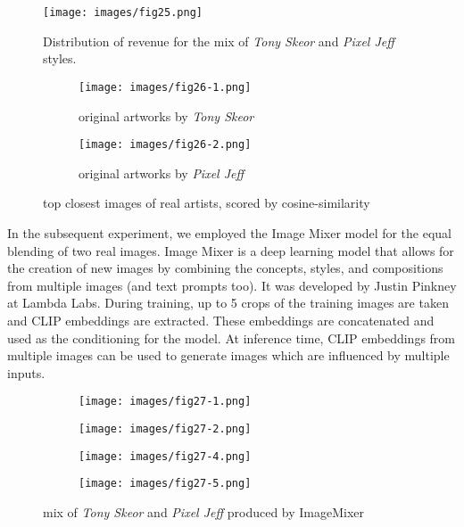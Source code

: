\documentclass[12pt, letterpaper]{article}
\begin{document}
\begin{figure}[h]
    \centering
    \texttt{[image: images/fig25.png]}
    \caption{Distribution of revenue for the mix of \textit{Tony Skeor} and \textit{Pixel Jeff} styles.}
    \label{fig25:image1}
\end{figure}

\begin{figure}[h]
    \centering
    
    \begin{subfigure}{0.48\textwidth}
        \centering
        \texttt{[image: images/fig26-1.png]}
        \caption{original artworks by \textit{Tony Skeor}}
        \label{fig26:first_image}
    \end{subfigure}
    \begin{subfigure}{0.48\textwidth}
        \centering
        \texttt{[image: images/fig26-2.png]}
        \caption{original artworks by \textit{Pixel Jeff}}
        \label{fig26:second_image}
    \end{subfigure}

    \caption{top closest images of real artists, scored by cosine-similarity}
    \label{fig26:all_images}    

\end{figure}

In the subsequent experiment, we employed the Image Mixer \cite{pinkney2022imagemixer} model for the equal blending of two real images. 
Image Mixer is a deep learning model that allows for the creation of new images by combining the concepts, styles, and compositions from multiple images (and text prompts too). It was developed by Justin Pinkney at Lambda Labs. During training, up to 5 crops of the training images are taken and CLIP embeddings are extracted. These embeddings are concatenated and used as the conditioning for the model. At inference time, CLIP embeddings from multiple images can be used to generate images which are influenced by multiple inputs.

\begin{figure}[h]
    \centering
    \begin{subfigure}{0.24\textwidth}
        \centering
        \texttt{[image: images/fig27-1.png]}
    \end{subfigure}
    \begin{subfigure}{0.24\textwidth}
        \centering
        \texttt{[image: images/fig27-2.png]}
    \end{subfigure}
    \begin{subfigure}{0.24\textwidth}
        \centering
        \texttt{[image: images/fig27-4.png]}
    \end{subfigure}
    \begin{subfigure}{0.24\textwidth}
        \centering
        \texttt{[image: images/fig27-5.png]}
    \end{subfigure}
    \caption{mix of \textit{Tony Skeor} and \textit{Pixel Jeff} produced by ImageMixer}
    \label{fig27:all_images}    
\end{figure}
\end{document}
